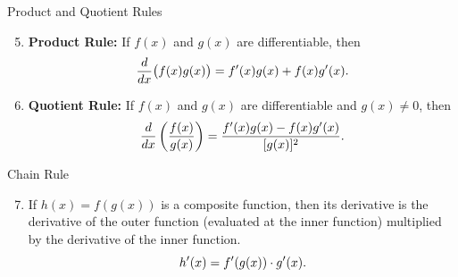 \begin{theorem}{Product and Quotient Rules}
    \begin{enumerate}
        \setcounter{enumi}{4}
        \vspace{0.5em}
        \item \textbf{Product Rule:} If \(f(x)\) and \(g(x)\) are differentiable, then \vspace{0.5em}
        \[
        \frac{d}{dx}\big(f(x)g(x)\big)=f'(x)g(x)+f(x)g'(x). \vspace{0.5em}
        \] \vspace{0.5em}
        \item \textbf{Quotient Rule:} If \(f(x)\) and \(g(x)\) are differentiable and \(g(x)\neq0\), then
        \vspace{0.5em}
        \[
        \frac{d}{dx}\left(\frac{f(x)}{g(x)}\right)=\frac{f'(x)g(x)-f(x)g'(x)}{[g(x)]^2}. \vspace{0.5em}
        \]
    \end{enumerate}
\end{theorem}

\begin{theorem}{Chain Rule}
    \vspace{0.5em}
    \begin{enumerate}
    \setcounter{enumi}{6}
        \item If \( h(x) = f(g(x)) \) is a composite function, then its derivative is the derivative of the outer function (evaluated at the inner function) multiplied by the derivative of the inner function. \vspace{0.5em}
        \[
        h'(x) = f'(g(x)) \cdot g'(x). \vspace{0.5em}
        \]
    \end{enumerate}
\end{theorem}

